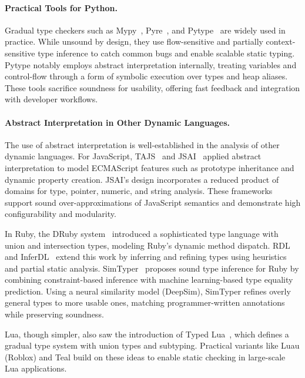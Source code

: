 \paragraph{Practical Tools for Python.}
Gradual type checkers such as Mypy~\cite{mypy}, Pyre~\cite{pyre}, and Pytype~\cite{pytype} are widely used in practice. While unsound by design, they use flow-sensitive and partially context-sensitive type inference to catch common bugs and enable scalable static typing. Pytype notably employs abstract interpretation internally, treating variables and control-flow through a form of symbolic execution over types and heap aliases. These tools sacrifice soundness for usability, offering fast feedback and integration with developer workflows.

\paragraph{Abstract Interpretation in Other Dynamic Languages.}
The use of abstract interpretation is well-established in the analysis of other dynamic languages. For JavaScript, TAJS~\cite{jensen2009type} and JSAI~\cite{kashyap2014jsai} applied abstract interpretation to model ECMAScript features such as prototype inheritance and dynamic property creation. JSAI's design incorporates a reduced product of domains for type, pointer, numeric, and string analysis. These frameworks support sound over-approximations of JavaScript semantics and demonstrate high configurability and modularity.

In Ruby, the DRuby system~\cite{furr2009static} introduced a sophisticated type language with union and intersection types, modeling Ruby's dynamic method dispatch. RDL and InferDL~\cite{kazerounian2020sound} extend this work by inferring and refining types using heuristics and partial static analysis. SimTyper~\cite{kazerounian2021simtyper} proposes sound type inference for Ruby by combining constraint-based inference with machine learning-based type equality prediction. Using a neural similarity model (DeepSim), SimTyper refines overly general types to more usable ones, matching programmer-written annotations while preserving soundness.

Lua, though simpler, also saw the introduction of Typed Lua~\cite{maidl2014typed}, which defines a gradual type system with union types and subtyping. Practical variants like Luau (Roblox) and Teal build on these ideas to enable static checking in large-scale Lua applications.

